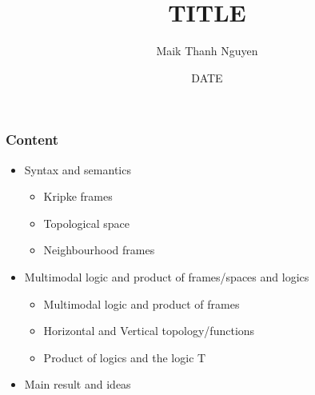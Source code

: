 \documentclass[hyperref={pdfpagelabels=false},t,10pt]{beamer}
\title{TITLE}
\author[© author]{Maik Thanh Nguyen}
\institute{Technische Universit\"at Dresden}
\date{DATE}
\begin{document}
\addtocounter{framenumber}{-1}
\maketitle

\begin{frame}
  \frametitle{Content}

  \begin{itemize}
  \item Syntax and semantics
    \begin{itemize}
        \item Kripke frames
        \item Topological space
        \item Neighbourhood frames
     \end{itemize}
  \item Multimodal logic and product of frames/spaces and logics
    \begin{itemize}
      \item Multimodal logic and product of frames
      \item Horizontal and Vertical topology/functions
      \item Product of logics and the logic T
    \end{itemize}
  \item Main result and ideas
  \end{itemize}
\end{frame}
\end{document}
